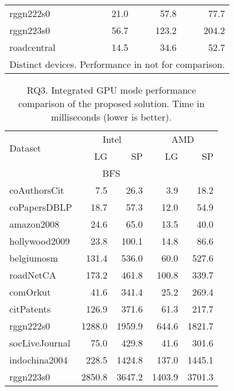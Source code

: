 \begin{table}[tbp]
\begin{center}
\begin{tabular}{|l|r|r|r|}
        \rowcolor{black!2 } rggn222s0&21.0&57.8&77.7\\
        \rowcolor{black!10} rggn223s0&56.7&123.2&204.2\\
        \rowcolor{black!2 } roadcentral&14.5&34.6&52.7\\
        \hline
        \hline
        \multicolumn{4}{l}{Distinct devices. Performance in not for comparison.} \\
        \end{tabular}
        \label{rq2_table}
    \end{center}
    \end{table}
    
    \begin{table}[tbp]
    \caption{RQ3. Integrated GPU mode performance comparison of the proposed solution. Time in milliseconds (lower is better).} 
    \begin{center}
        \begin{tabular}{|l|r|r|r|r|}
        \hline
        \multirow{2}{*}{Dataset} & \multicolumn{2}{c|}{Intel} & \multicolumn{2}{c|}{AMD} \\
        \cline{2-5}
        & LG & SP & LG & SP \\
        \hline
        \hline
        \multicolumn{5}{|c|}{BFS} \\
        \hline
        \rowcolor{black!10} coAuthorsCit&7.5&26.3&3.9&18.2\\
        \rowcolor{black!2 } coPapersDBLP&18.7&57.3&12.0&54.9\\
        \rowcolor{black!10} amazon2008&24.6&65.0&13.5&40.0\\
        \rowcolor{black!2 } hollywood2009&23.8&100.1&14.8&86.6\\
        \rowcolor{black!10} belgiumosm&131.4&536.0&60.0&527.6\\
        \rowcolor{black!2 } roadNetCA&173.2&461.8&100.8&339.7\\
        \rowcolor{black!10} comOrkut&41.6&341.4&25.2&269.4\\
        \rowcolor{black!2 } citPatents&126.9&371.6&61.3&217.7\\
        \rowcolor{black!10} rggn222s0&1288.0&1959.9&644.6&1821.7\\
        \rowcolor{black!2 } socLiveJournal&75.0&429.8&41.6&301.6\\
        \rowcolor{black!10} indochina2004&228.5&1424.8&137.0&1445.1\\
        \rowcolor{black!2 } rggn223s0&2850.8&3647.2&1403.9&3701.3\\

\end{tabular}
\end{center}
\end{table}

